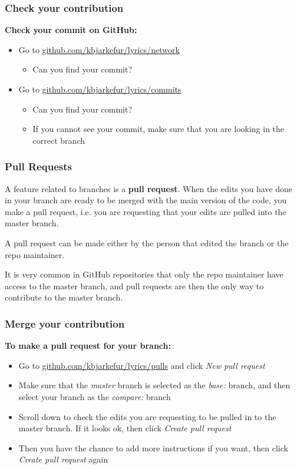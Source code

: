 \documentclass[aspectratio=169]{beamer} %
\newcommand{\trainingURL}[1]{{\color{blue}\url{#1}}}
\newcommand{\traininerUsername}{kbjarkefur}
\newcommand{\repoName}{\traininerUsername/lyrics}
\newcommand{\trainingRepoURL}[1]{\trainingURL{github.com/\repoName #1}}
\begin{document}
\begin{frame}
\frametitle{Check your contribution}

	\textbf{Check your commit on GitHub:}
	\begin{itemize}
		\item Go to \trainingRepoURL{/network}
		\begin{itemize}
			\item Can you find your commit?
		\end{itemize}
		\item Go to \trainingRepoURL{/commits}
		\begin{itemize}
			\item Can you find your commit?
			\item If you cannot see your commit, make sure that you are looking in the correct branch
		\end{itemize}
	\end{itemize}

\end{frame}

\begin{frame}
\frametitle{Pull Requests}

	A feature related to branches is a \textbf{pull request}. When the edits you have done in your branch are ready to be merged with the main version of the code, you make a pull request, i.e. you are requesting that your edits are pulled into the master branch.
	
	
	A pull request can be made either by the person that edited the branch or the repo maintainer. 
	
	It is very common in GitHub repositories that only the repo maintainer have access to the master branch, and pull requests are then the only way to contribute to the master branch.  


\end{frame}

\begin{frame}
\frametitle{Merge your contribution}

	\textbf{To make a pull request for your branch:}
	\begin{itemize}
		\item Go to \trainingRepoURL{/pulls} and click \textit{New pull request}
		\item Make sure that the \textit{master} branch is selected as the \textit{base:} branch, and then select your branch as the \textit{compare:} branch
		\item Scroll down to check the edits you are requesting to be pulled in to the master branch. If it looks ok, then click \textit{Create pull request}
		\item Then you have the chance to add more instructions if you want, then click \textit{Create pull request} again 
	\end{itemize}
\end{frame}
\end{document}

